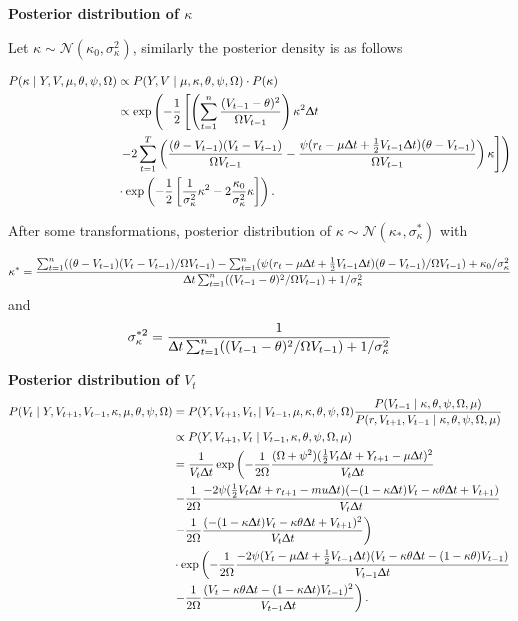 \documentclass[12pt,a4paper]{article}
\numberwithin{equation}{section}
\begin{document}
\textbf{Posterior distribution of $\kappa$}

Let $\kappa \sim \mathcal{N}(\kappa_0, \sigma_\kappa^2)$, similarly the posterior density is as follows

\begin{align*}
P(\kappa \mid Y, V, \mu, \theta, \psi, \Omega) & \propto P(Y, V \mid \mu, \kappa, \theta, \psi, \Omega) \cdot P(\kappa) \\
& \propto\exp\left(-\frac{1}{2} \left[\left(\sum_{t=1}^n \frac{(V_{t-1} - \theta)^2}{\Omega V_{t-1}} \right) \kappa^2 \Updelta t \right. \right. \\ 
& \left. \left. - 2\sum_{t=1}^T \left( \frac{(\theta - V_{t-1}) (V_t - V_{t-1})}{\Omega V_{t-1}} - \frac{\psi (r_t - \mu \Updelta t + \frac{1}{2} V_{t-1} \Updelta t )(\theta - V_{t-1})}{\Omega V_{t-1}} \right) \kappa \right] \right) \\
& \cdot \exp\left(-\frac{1}{2} \left[\frac{1}{\sigma_\kappa^2} \kappa^2 - 2 \frac{\kappa_0}{\sigma_\kappa^2} \kappa \right] \right).
\end{align*}

After some transformations, posterior distribution of $\kappa \sim \mathcal{N}(\kappa_*, \sigma_\kappa^*)$ with

\[
\kappa^* = \frac{\sum_{t=1}^n ((\theta - V_{t-1}) (V_t - V_{t-1})/\Omega V_{t-1}) - \sum_{t=1}^n (\psi (r_t - \mu \Updelta t + \frac{1}{2} V_{t-1} \Updelta t )(\theta - V_{t-1})/\Omega V_{t-1}) + \kappa_0/\sigma_\kappa^2}{\Updelta t \sum_{t=1}^n ((V_{t-1}-\theta)^2/\Omega V_{t-1}) + 1 / \sigma_\kappa^2}
\]
and
\[
\sigma_\kappa^{*2} = \frac{1}{\Updelta t \sum_{t=1}^n ((V_{t-1}-\theta)^2/\Omega V_{t-1}) + 1 / \sigma_\kappa^2}
\]

\textbf{Posterior distribution of $V_t$}
\begin{align*}
P(V_t \mid Y, V_{t+1}, V_{t-1}, \kappa, \mu, \theta, \psi, \Omega) &= P(Y, V_{t+1}, V_{t}, \mid V_{t-1}, \mu, \kappa, \theta, \psi, \Omega) \frac{P(V_{t-1} \mid \kappa, \theta, \psi, \Omega, \mu)}{P(r, V_{t+1}, V_{t-1} \mid \kappa, \theta, \psi, \Omega, \mu)}\\
& \propto P(Y, V_{t+1}, V_{t} \mid V_{t-1}, \kappa, \theta, \psi, \Omega, \mu)\\
&=\frac{1}{V_t \Updelta t}\exp\left(-\frac{1}{2 \Omega} \frac{(\Omega + \psi^2)(\frac{1}{2}V_t \Updelta t + Y_{t+1} - \mu \Updelta t)^2}{V_t \Updelta t} \right. \\ 
& \left. -\frac{1}{2 \Omega} \frac{-2\psi (\frac{1}{2}V_t \Updelta t + r_{t+1} -mu \Updelta t)(-(1-\kappa \Updelta t)V_t -\kappa \theta \Updelta t + V_{t+1})}{V_t \Updelta t} \right. \\
& \left. -\frac{1}{2 \Omega} \frac{(-(1-\kappa \Updelta t) V_t - \kappa \theta \Updelta t + V_{t+1})^2}{V_t \Updelta t} \right) \\
& \cdot \exp \left( - \frac{1}{2 \Omega} \frac{-2 \psi (Y_t - \mu \Updelta t + \frac{1}{2}V_{t-1} \Updelta t)(V_t - \kappa \theta \Updelta t - (1-\kappa \theta)V_{t-1})}{V_{t-1} \Updelta t} \right. \\
& \left. -\frac{1}{2 \Omega} \frac{(V_t - \kappa \theta \Updelta t - (1-\kappa\Updelta t)V_{t-1})^2}{V_{t-1}\Updelta t}\right).
\end{align*}
\end{document}
